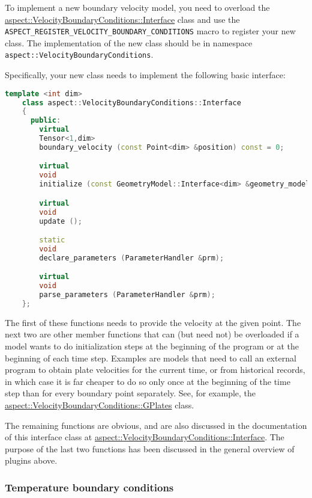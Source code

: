 \documentclass{article}
\begin{document}
To implement a new boundary velocity model, you
need to overload the
\href{doc/doxygen/classaspect_1_1VelocityBoundaryConditions_1_1Interface.html}{aspect::VelocityBoundaryConditions::Interface}
class and use
the \texttt{ASPECT\_REGISTER\_VELOCITY\_BOUNDARY\_CONDITIONS} macro to
register your new class. The implementation of the new class should be in namespace
\texttt{aspect::VelocityBoundaryConditions}.

Specifically, your new class needs to implement the following basic interface:
\begin{lstlisting}[frame=single,language=C++]
    template <int dim>
    class aspect::VelocityBoundaryConditions::Interface
    {
      public:
        virtual
        Tensor<1,dim>
        boundary_velocity (const Point<dim> &position) const = 0;

        virtual
        void
        initialize (const GeometryModel::Interface<dim> &geometry_model);

        virtual
        void
        update ();

        static
        void
        declare_parameters (ParameterHandler &prm);

        virtual
        void
        parse_parameters (ParameterHandler &prm);
    };
\end{lstlisting}
The first of these functions needs to provide the velocity at the
given point. The next two are other member functions that can
(but need not) be overloaded if a model wants to do initialization steps at the
beginning of the program or at the beginning of each time step. Examples are
models that need to call an external program to obtain plate velocities for the
current time, or from historical records, in which case it is far cheaper to do
so only once at the beginning of the time step than for every boundary point
separately. See, for example, the 
\href{doc/doxygen/classaspect_1_1VelocityBoundaryConditions_1_1GPlates.html}{aspect::VelocityBoundaryConditions::GPlates}
class.

The remaining functions are obvious, and are also
discussed in the documentation of this interface class at
\href{doc/doxygen/classaspect_1_1VelocityBoundaryConditions_1_1Interface.html}{aspect::VelocityBoundaryConditions::Interface}.
The purpose
of the last two functions has been discussed in the general overview of
plugins above.


\subsubsection{Temperature boundary conditions}
\label{sec:temperature-boundary-conditions}
\end{document}
